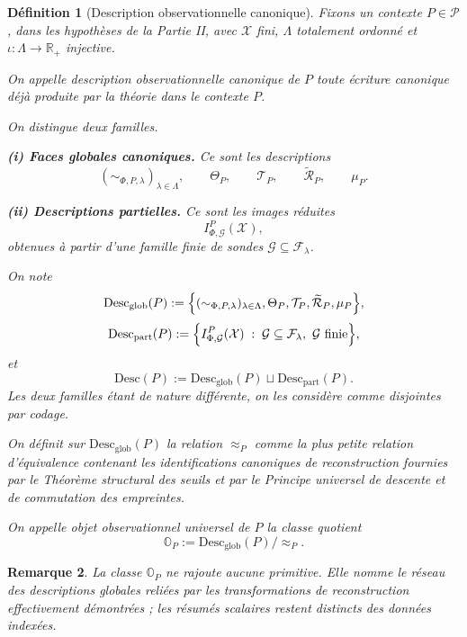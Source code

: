 \documentclass[11pt,a4paper,openany]{book}
\newtheorem{definition}{Définition}[chapter]
\newtheorem{remark}[definition]{Remarque}
\begin{document}
\begin{definition}[Description observationnelle canonique]
Fixons un contexte \(P\in\mathcal P\), dans les hypothèses de la Partie II, avec \(\mathcal X\) fini, \(\Lambda\) totalement ordonné et \(\iota:\Lambda\to\mathbb R_+\) injective.

On appelle \emph{description observationnelle canonique} de \(P\) toute écriture canonique déjà produite par la théorie dans le contexte \(P\).

On distingue deux familles.

\medskip
\noindent\textbf{(i) Faces globales canoniques.}
Ce sont les descriptions
\[
(\sim_{\Phi,P,\lambda})_{\lambda\in\Lambda},
\qquad
\Theta_P,
\qquad
\mathcal T_P,
\qquad
\widetilde{\mathcal R}_P,
\qquad
\mu_P.
\]

\medskip
\noindent\textbf{(ii) Descriptions partielles.}
Ce sont les images réduites
\[
I_{\Phi,\mathcal G}^P(\mathcal X),
\]
obtenues à partir d'une famille finie de sondes \(\mathcal G\subseteq\mathcal F_\lambda\).

On note
\[
\mathrm{Desc}_{\mathrm{glob}}(P)
:=
\Bigl\{
(\sim_{\Phi,P,\lambda})_{\lambda\in\Lambda},
\Theta_P,
\mathcal T_P,
\widetilde{\mathcal R}_P,
\mu_P
\Bigr\},
\]
\[
\mathrm{Desc}_{\mathrm{part}}(P)
:=
\Bigl\{
I_{\Phi,\mathcal G}^P(\mathcal X)\;:\;\mathcal G\subseteq\mathcal F_\lambda,\ \mathcal G \text{ finie}
\Bigr\},
\]
et
\[
\mathrm{Desc}(P):=\mathrm{Desc}_{\mathrm{glob}}(P)\sqcup \mathrm{Desc}_{\mathrm{part}}(P).
\]
Les deux familles étant de nature différente, on les considère comme disjointes par codage.

On définit sur \(\mathrm{Desc}_{\mathrm{glob}}(P)\) la relation \(\approx_P\) comme la plus petite relation d'équivalence contenant les identifications canoniques de reconstruction fournies par le \emph{Théorème structural des seuils} et par le \emph{Principe universel de descente et de commutation des empreintes}.

On appelle \emph{objet observationnel universel} de \(P\) la classe quotient
\[
\mathbb O_P := \mathrm{Desc}_{\mathrm{glob}}(P)/\!\approx_P.
\]
\end{definition}

\begin{remark}
La classe \(\mathbb O_P\) ne rajoute aucune primitive. Elle nomme le réseau des descriptions globales reliées par les transformations de reconstruction effectivement démontrées ; les résumés scalaires restent distincts des données indexées.
\end{remark}
\end{document}

